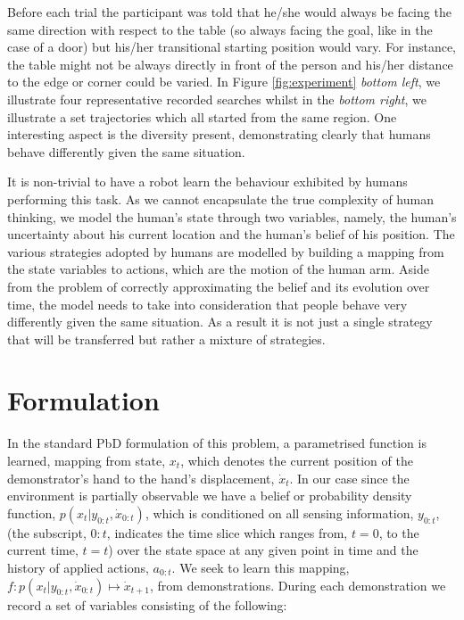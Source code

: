 Before each trial the participant was told that he/she would always be facing the same direction with respect to the table (so always facing the goal, 
like in the case of a door) but his/her transitional starting position would vary. 
For instance, the table might not be always directly in front of the person and his/her distance to the edge or 
corner could be varied. In Figure \ref{fig:experiment}
\textit{bottom left}, we illustrate four representative recorded searches whilst in the \textit{bottom right}, we illustrate a set trajectories 
which all started from the same region. One interesting aspect is the diversity present,
demonstrating clearly that humans behave differently given the same situation.  

It is non-trivial to have a robot learn the behaviour exhibited by humans performing this task. As we cannot encapsulate the true complexity of 
human thinking, we model the human's state through two variables, namely, the human's uncertainty about his current location and the human's  
belief of his position. The various strategies adopted by humans are modelled by building a mapping from the state variables to actions, which are the motion of 
the human arm. Aside from the problem of correctly approximating the belief and its evolution over time, the model needs to take into consideration
that people behave very differently given the same situation. As a result it is not just a single strategy that will be transferred but rather a mixture 
of strategies. 


\section{Formulation} \label{ch3:formulation}

In the standard PbD formulation of this problem, a parametrised function is learned,
mapping from state, $x_t$, which denotes the current position of the demonstrator's hand to  
the hand's displacement, $\dot{x}_t$. In our case since the environment is partially observable 
we have a belief or probability density function, $p(x_{t}|y_{0:t},\dot{x}_{0:t})$, which is conditioned on all 
sensing information, $y_{0:t}$, (the subscript, $0:t$, indicates the time slice which ranges from, $t=0$, to 
the current time, $t=t$) over the state space at any given point in time and the history of applied actions, $a_{0:t}$. 
We seek to learn this mapping, $f : p(x_{t}|y_{0:t},\dot{x}_{0:t}) \mapsto \dot{x}_{t+1}$, from demonstrations. During 
each demonstration we record a set of variables consisting of the following:

